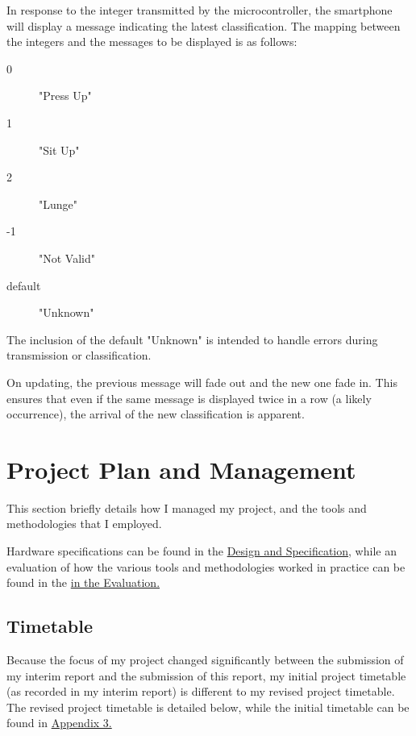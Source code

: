 \documentclass[a4paper]{article}
\begin{document}
In response to the integer transmitted by the microcontroller, the smartphone will display a message indicating the latest classification. The mapping between the integers and the messages to be displayed is as follows:
\begin{description}
\item[0] "Press Up"
\item[1] "Sit Up"
\item[2] "Lunge"
\item[-1] "Not Valid"
\item[default] "Unknown"
\end{description}

The inclusion of the default "Unknown" is intended to handle errors during transmission or classification.

On updating, the previous message will fade out and the new one fade in. This ensures that even if the same message is displayed twice in a row (a likely occurrence), the arrival of the new classification is apparent.

\newpage
\section{Project Plan and Management}
\label{sec:pp}

This section briefly details how I managed my project, and the tools and methodologies that I employed. 

Hardware specifications can be found in the \hyperref[subsec:dc_hardware]{Design and Specification}, while an evaluation of how the various tools and methodologies worked in practice can be found in the \hyperref[subsec:ev_pm]{in the Evaluation.}

\subsection{Timetable}%
\label{subsec:pp_tt}

Because the focus of my project changed significantly between the submission of my interim report and the submission of this report, my initial project timetable (as recorded in my interim report) is different to my revised project timetable. The revised project timetable is detailed below, while the initial timetable can be found in \hyperref[subsec:a3_it]{Appendix 3.}
\end{document}
